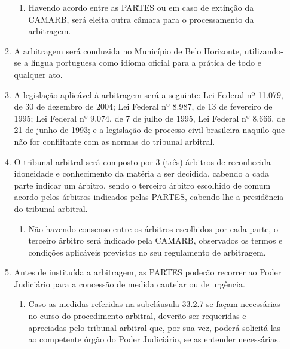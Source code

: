 \documentclass[a4paper,11pt]{report} %
\begin{document}
\begin{enumerate}
\begin{enumerate}[label*=\arabic*.]
\begin{enumerate}[label*=\arabic*.]
\item \label{itm:ZB5E} Havendo acordo entre as PARTES ou em caso de extinção da CAMARB, será eleita outra câmara para o processamento da arbitragem.
\end{enumerate}

\item \label{itm:LY3J} A arbitragem será conduzida no Município de Belo Horizonte, utilizando-se a língua portuguesa como idioma oficial para a prática de todo e qualquer ato.

\item \label{itm:LSUA} A legislação aplicável à arbitragem será a seguinte: Lei Federal nº 11.079, de 30 de dezembro de 2004; Lei Federal nº 8.987, de 13 de fevereiro de 1995; Lei Federal nº 9.074, de 7 de julho de 1995, Lei Federal nº 8.666, de 21 de junho de 1993; e a legislação de processo civil brasileira naquilo que não for conflitante com as normas do tribunal arbitral.

\item \label{itm:3N3U} O tribunal arbitral será composto por 3 (três) árbitros de reconhecida idoneidade e conhecimento da matéria a ser decidida, cabendo a cada parte indicar um árbitro, sendo o terceiro árbitro escolhido de comum acordo pelos árbitros indicados pelas PARTES, cabendo-lhe a presidência do tribunal arbitral.

\begin{enumerate}[label*=\arabic*.]
\item \label{itm:6EU7} Não havendo consenso entre os árbitros escolhidos por cada parte, o terceiro árbitro será indicado pela CAMARB, observados os termos e condições aplicáveis previstos no seu regulamento de arbitragem.
\end{enumerate}

\item \label{itm:EPC7} Antes de instituída a arbitragem, as PARTES poderão recorrer ao Poder Judiciário para a concessão de medida cautelar ou de urgência.

\begin{enumerate}[label*=\arabic*.]
\item \label{itm:5Y7M} Caso as medidas referidas na subcláusula 33.2.7 se façam necessárias no curso do procedimento arbitral, deverão ser requeridas e apreciadas pelo tribunal arbitral que, por sua vez, poderá solicitá-las ao competente órgão do Poder Judiciário, se as entender necessárias.
\end{enumerate}


\end{enumerate}
\end{enumerate}
\end{document}
